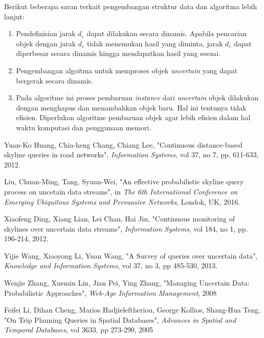 \documentclass[conference]{IEEEtran}
\begin{document}
Berikut beberapa saran terkait pengembangan struktur data dan algoritma lebih lanjut:

\begin{enumerate}
	\item Pendefinisian jarak $ d_\varepsilon $ dapat dilakukan secara dinamis. Apabila pencarian objek dengan jarak $ d_\varepsilon $ tidak menemukan hasil yang diminta, jarak $ d_\varepsilon $ dapat diperbesar secara dinamis hingga mendapatkan hasil yang sesuai.
	\item Pengembangan algoitma untuk memproses objek \textit{uncertain} yang dapat bergerak secara dinamis.
	\item Pada algoritme ini proses pembaruan \textit{instance} dari \textit{uncertain} objek dilakukan dengan menghapus dan menambahkan objek baru. Hal ini tentunya tidak efisien. Diperlukan algoritme pembaruan objek agar lebih efisien dalam hal waktu komputasi dan penggunaan memori.
\end{enumerate}

\begin{thebibliography}{00}

Yuan-Ko Huang, Chia-heng Chang, Chiang Lee, "Continuous distance-based skyline queries in road networks", \textit{Information Systems}, vol 37, no 7, pp. 611-633, 2012.

Liu, Chuan-Ming, Tang, Syuan-Wei, "An effective probabilistic skyline query process on uncetain data streams", in \textit{The 6th International Conference on Emerging Ubiquitous Systems and Persuasive Networks}, Londok, UK, 2016.

Xiaofeng Ding, Xiang Lian, Lei Chan, Hai Jin, "Continuous monitoring of skylines over uncertain data streams", \textit{Information Systems}, vol 184, no 1, pp. 196-214, 2012.

Yijie Wang, Xiaoyong Li, Yuan Wang, "A Survey of queries over uncertain data", \textit{Knowledge and Information Systems}, vol 37, no 3, pp 485-530, 2013.

Wenjie Zhang, Xuemin Lin, Jian Pei, Ying Zhang, "Managing Uncertain Data: Probabilistic Approaches", \textit{Web-Age Information Management}, 2008

Feifei Li, Dihan Cheng, Marios Hadjieleftheriou, George Kollios, Shang-Hua Teng, "On Trip Planning Queries in Spatial Databases", \textit{Advances in Spatial and Temporal Databases}, vol 3633, pp 273-290, 2005

\end{thebibliography}
\end{document}
